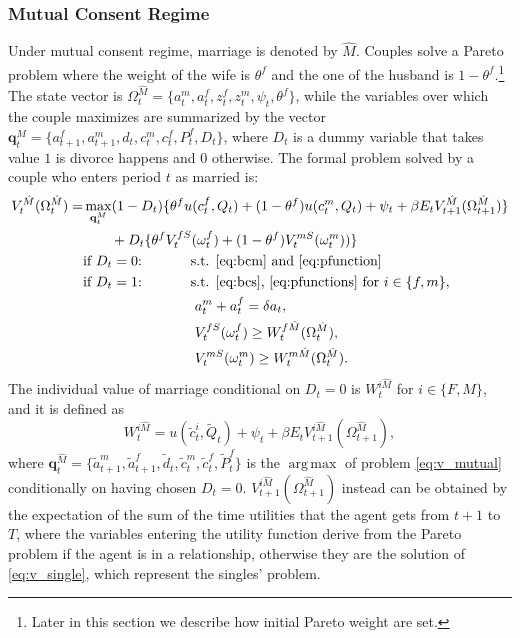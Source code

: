 \documentclass[12pt]{article}
\numberwithin{table}{section}
\DeclareMathOperator*{\argmax}{arg\,max}
\begin{document}
\subsubsection*{Mutual Consent Regime}
Under mutual consent regime, marriage is denoted by $\hat{M}$. Couples solve a Pareto problem where the weight of the wife is $\theta^f$ and the one of the husband is $1-\theta^f$.\footnote{Later in this section we describe how initial Pareto weight are set.} The state vector is $\Omega^{\hat{M}}_t=\{a^m_t,a^f_t,z^f_t,z^m_t,\psi_t,\theta^f\}$, while the variables over which the couple maximizes are summarized by the vector $\mathbf{q}^M_t=\{a^f_{t+1},a^m_{t+1},d_{t},c^m_{t},c^f_{t},P^f_t,D_t\}$, where $D_t$ is a dummy variable that takes value $1$ is divorce happens and $0$ otherwise. The formal problem solved by a couple who enters period $t$ as married is:
\begin{equation}\label{eq:v_mutual}
\begin{split}
V_t^{\hat{M}}(\Omega^{\hat{M}}_t)=&\max_{\mathbf{q}^M_t} (1-D_t)\{\theta^f u(c^f_t,Q_t)+(1-\theta^f)u(c^m_t,Q_t)+\psi_t+\beta E_t V^{\hat{M}}_{t+1}(\Omega^{\hat{M}}_{t+1})\}\\ &\quad\quad+D_t \{\theta^fV^{fS}_{t}(\omega^{f}_{t})+(1-\theta^f)  V^{mS}_{t}(\omega^{m}_{t}))\}
\\ &\text{if $D_t=0$:}\hspace{35pt}\text{s.t. \eqref{eq:bcm} and \eqref{eq:pfunction}
}
\\ &\text{if $D_t=1$:}\hspace{35pt}\text{s.t. \eqref{eq:bcs}, \eqref{eq:pfunctions} for $i\in\{f,m\}$,}\\ &
\hspace{80pt}a_t^m+a_t^f=\delta a_t,	\\ &\hspace{80pt}
V_{t}^{fS}(\omega^f_{t})\ge W^{f\hat{M}}_{t}(\Omega^{\hat{M}}_{t}),\\ &\hspace{80pt}
V_{t}^{mS}(\omega^m_{t})\ge W^{m\hat{M}}_{t}(\Omega^{\hat{M}}_{t}).
\end{split}
\end{equation}
The individual value of marriage conditional on $D_t=0$ is $W_{t}^{i\hat{M}}$ for $i\in\{F,M\}$, and it is defined as 
\begin{equation}
W_{t}^{i\hat{M}}=u(\tilde{c}_t^{i},\tilde{Q}_t)+\psi_t+\beta E_t V_{t+1}^{i\hat{M}}(\Omega^{\hat{M}}_{t+1}),
\end{equation}
where $\mathbf{q}^{\hat{M}}_t=\{\tilde{a}^m_{t+1},\tilde{a}^f_{t+1},\tilde{d}_{t},\tilde{c}^{m}_{t},\tilde{c}^{f}_{t},\tilde{P}^{f}_t\}$ is the $\argmax$ of problem \eqref{eq:v_mutual} conditionally on having chosen $D_t=0$. $V_{t+1}^{i\hat{M}}(\Omega^{\hat{M}}_{t+1})$ instead can be obtained by the expectation of the sum of the time utilities that the agent gets from $t+1$ to $T$, where the variables entering the utility function derive from the Pareto problem if the agent is in a relationship, otherwise they are the solution of \eqref{eq:v_single}, which represent the singles' problem.
\end{document}
